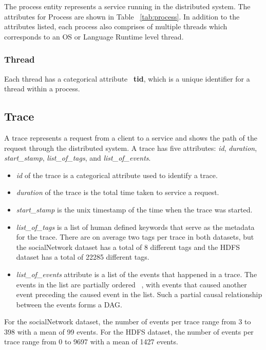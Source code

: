 The process entity represents a service running in the distributed system.
The attributes for Process are shown in Table ~\ref{tab:process}.
In addition to the attributes listed, each process also comprises of
multiple threads which corresponds to an OS or Language Runtime level thread.

\subsubsection{Thread}

Each thread has a categorical attribute ~\textbf{tid}, which is a unique identifier
for a thread within a process.

\subsection{Trace}

A trace represents a request from a client to a service and shows the path of the
request through the distributed system.
A trace has five attributes: \textit{id}, \textit{duration}, \textit{start\_stamp}, \textit{list\_of\_tags}, and \textit{list\_of\_events}.

\begin{itemize}
  \item \textit{id} of the trace is a categorical attribute used to identify a trace. 
  \item \textit{duration} of the trace is the total time taken to service a request.
  \item \textit{start\_stamp} is the unix timestamp of the time when the trace was started.
  \item \textit{list\_of\_tags} is a list of human defined keywords that serve as
the metadata for the trace. There are on average two tags per trace in both datasets, but the socialNetwork
dataset has a total of 8 different tags and the HDFS dataset has a total of 22285 different tags. 
  \item \textit{list\_of\_events} attribute is a list of the events that happened in a trace. The events in the list
are partially ordered ~\cite{lamport1978time}, with events that caused another event preceding the caused event in the list. 
Such a partial causal relationship between the events forms a DAG.
\end{itemize}

For the socialNetwork dataset, the number of events per trace range from 3 to 398 with a mean of 99 events.
For the HDFS dataset, the number of events per trace range from 0 to 9697 with a mean of 1427 events.

